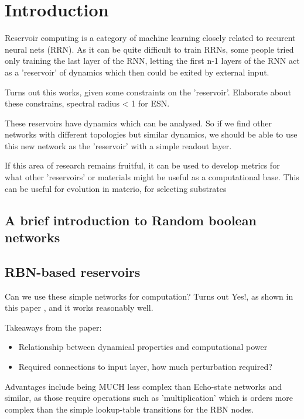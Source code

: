 \section{Introduction}

Reservoir computing is a category of machine learning closely related to recurent neural nets (RRN).
As it can be quite difficult to train RRNs, some people \cite{liquidstatepaper} \cite{echostatenetworkpaper} tried only training the last layer of the RNN,
letting the first n-1 layers of the RNN act as a 'reservoir' of dynamics which then could be exited by external input.

Turns out this works, given some constraints on the 'reservoir'.
Elaborate about these constrains, spectral radius < 1 for ESN.

These reservoirs have dynamics which can be analysed.
So if we find other networks with different topologies but similar dynamics,
we should be able to use this new network as the 'reservoir' with a simple readout layer.

If this area of research remains fruitful, it can be used to develop metrics for what other 'reservoirs' or materials might be useful as a  computational base.
This can be useful for evolution in materio, for selecting substrates \cite{evolutionInMaterio}


\subsection{A brief introduction to Random boolean networks}

\subsection{RBN-based reservoirs}

Can we use these simple networks for computation?
Turns out Yes!, as shown in this paper \cite{rbn-reservoir}, and it works reasonably well.

Takeaways from the paper:
\begin{itemize}
  \item Relationship between dynamical properties and computational power
  \item Required connections to input layer, how much perturbation required?
\end{itemize}

Advantages include being MUCH less complex than Echo-state networks and similar, as those require operations such as 'multiplication' which is orders more complex than the simple lookup-table transitions for the RBN nodes.

